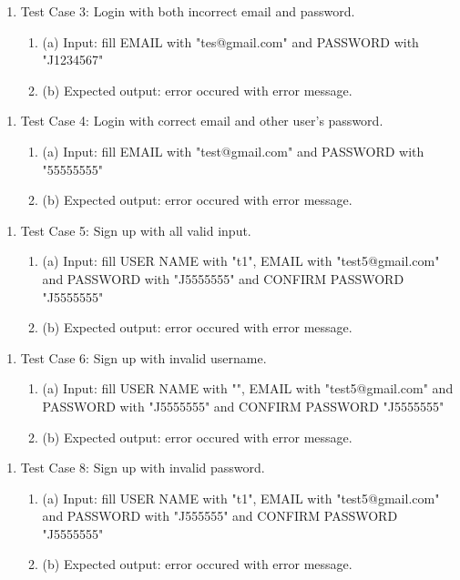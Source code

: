 \documentclass[11pt]{article}
\begin{document}
    \begin{enumerate}
        \item Test Case 3: Login with both incorrect email and password.
        \begin{enumerate}
            \item (a) Input: fill EMAIL with "tes@gmail.com" and PASSWORD with "J1234567"
            \item (b) Expected output: error occured with error message.
        \end{enumerate}
    \end{enumerate}
    \begin{enumerate}
        \item Test Case 4: Login with correct email and other user's password.
        \begin{enumerate}
            \item (a) Input: fill EMAIL with "test@gmail.com" and PASSWORD with "55555555"
            \item (b) Expected output: error occured with error message.
        \end{enumerate}
    \end{enumerate}
    \begin{enumerate}
        \item Test Case 5: Sign up with all valid input.
        \begin{enumerate}
            \item (a) Input: fill USER NAME with "t1", EMAIL with "test5@gmail.com" and PASSWORD with "J5555555" and CONFIRM PASSWORD "J5555555"
            \item (b) Expected output: error occured with error message.
        \end{enumerate}
    \end{enumerate}
    \begin{enumerate}
        \item Test Case 6: Sign up with invalid username.
        \begin{enumerate}
            \item (a) Input: fill USER NAME with "", EMAIL with "test5@gmail.com" and PASSWORD with "J5555555" and CONFIRM PASSWORD "J5555555"
            \item (b) Expected output: error occured with error message.
        \end{enumerate}
    \end{enumerate}
    \begin{enumerate}
        \item Test Case 8: Sign up with invalid password.
        \begin{enumerate}
            \item (a) Input: fill USER NAME with "t1", EMAIL with "test5@gmail.com" and PASSWORD with "J555555" and CONFIRM PASSWORD "J5555555"
            \item (b) Expected output: error occured with error message.
        \end{enumerate}
    \end{enumerate}
\end{document}
